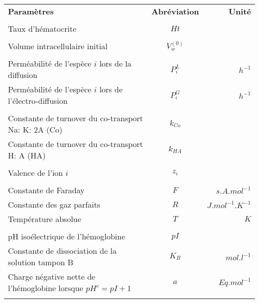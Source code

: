 \documentclass[a4paper,fleqn]{article}
\begin{document}
\begin{tabular}{p{8.4cm}cr}

\textbf{Paramètres}                                             & \textbf{Abréviation}     & \textbf{Unité}      \\\\

Taux d'hématocrite                                             & $Ht$                                           \\\\

Volume intracellulaire initial                                 & $V_{w}^{\left(0\right)}$                       \\\\

Perméabilité de l'espèce $i$ lors de la diffusion                  & $P_{i}^{L}$              & $h^{-1}$            \\
Perméabilité de l'espèce $i$ lors de l'électro-diffusion            & $P_{i}^{G}$              & $h^{-1}$            \\\\

Constante de turnover du co-transport Na: K: 2A (Co)            & $k_{Co}$                                       \\
Constante de turnover du co-transport H: A (HA)                 & $k_{HA}$                                       \\\\

Valence de l'ion $i$                                             & $z_i$                                          \\\\

Constante de Faraday                                           & $F$                      & $s.A.mol^{-1}$      \\
Constante des gaz parfaits                                     & $R$                      & $J.mol^{-1}.K^{-1}$ \\
Température absolue                                            & $T$                      & $K$                 \\\\

pH isoélectrique de l'hémoglobine                              & $pI$                                           \\
Constante de dissociation de la solution tampon B              & $K_B$                    & $mol.l^{-1}$        \\
Charge négative nette de l'hémoglobine lorsque $pH^c = pI + 1$ & $a$  & $Eq.mol^{-1}$  \\\\


\end{tabular}
\end{document}
